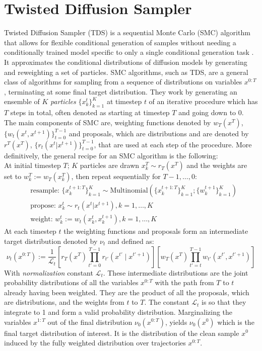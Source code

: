 \section{Twisted Diffusion Sampler}
Twisted Diffusion Sampler (TDS) is a sequential Monte Carlo (SMC) algorithm that allows for flexible conditional generation of samples without needing a conditionally trained model specific to only a single conditional generation task \cite{wu2024practicalasymptoticallyexactconditional}. It approximates the conditional distributions of diffusion models by generating and reweighting a set of particles. SMC algorithms, such as TDS, are a general class of algorithms for sampling from a sequence of distributions on variables $x^{0:T}$, terminating at some final target distribution. They work by generating an ensemble of $K$ \textit{particles} $\{x^t_k\}^K_{k=1}$ at timestep $t$ of an iterative procedure which has $T$ steps in total, often denoted as starting at timestep $T$ and going down to $0$. The main components of SMC are, weighting functions denoted by $w_T(x^T)$, $\{w_t(x^t, x^{t+1})\}^{T-1}_{t=0}$ and proposals, which are distributions and are denoted by $r^T(x^T)$, $\{r_t(x^t | x^{t+1})\}^{T-1}_{t=0}$, that are used at each step of the procedure. More definitively, the general recipe for an SMC algorithm is the following:\\
	At initial timestep $T$; $K$ particles are drawn $x^T_k \sim r_T(x^T)$ and the weights are set to $w^T_k := w_T(x^T_k)$, then repeat sequentially for $T - 1, \ldots, 0:$ 
	\begin{align*}
		&\text{resample: } \{x_k^{t+1:T}\}^K_{k=1} \sim \text{Multinomial}(\{x_k^{t+1:T}\}^K_{k=1};\{w^{t+1}_k\}_{k=1}^K)\\ 
	&\text{propose: }x_k^t \sim r_t(x^t | x^{t+1}), k = 1,\ldots,K\\
	&\text{weight: }w_k^t := w_t(x^t_k, x^{t+1}_k), k = 1,\ldots,K
\end{align*}
At each timestep $t$ the weighting functions and proposals form an intermediate target distribution \cite{wu2024practicalasymptoticallyexactconditional} denoted by $\nu_t$ and defined as:
\begin{equation}
	\nu_t(x^{0:T}) := \frac{1}{\mathcal{L}_t} \left[ r_T(x^T) \prod_{t'=0}^{T-1} r_{t'}(x^{t'} \mid x^{t'+1}) \right] \left[ w_T(x^T) \prod_{t'=t}^{T-1} w_{t'}(x^{t'}, x^{t'+1}) \right]
	\label{eq:intermediate_dist}
\end{equation}
With \textit{normalization} constant $\mathcal{L}_t$. These intermediate distributions are the joint probability distributions of all the variables $x^{0:T}$ with the path from $T$ to $t$ already having been weighted. They are the product of all the proposals, which are distributions, and the weights from $t$ to $T$. The constant $\mathcal{L}_t$ is so that they integrate to 1 and form a valid probability distribution. Marginalizing the variables $x^{1:T}$ out of the final distribution $\nu_0(x^{0:T})$, yields $\nu_0(x^{0})$ which is the final target distribution of interest. It is the distribution of the clean sample $x^0$ induced by the fully weighted distribution over trajectories $x^{0:T}$.\\

